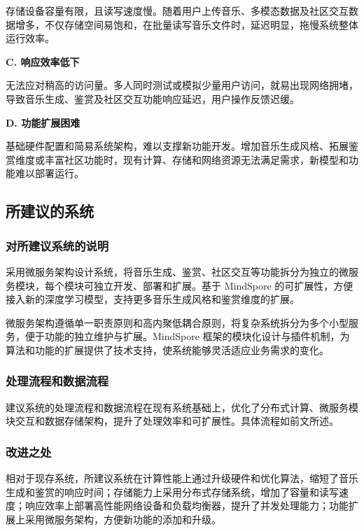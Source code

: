 \documentclass{base}
\numberwithin{figure}{section} %
\begin{document}
存储设备容量有限，且读写速度慢。随着用户上传音乐、多模态数据及社区交互数据增多，不仅存储空间易饱和，在批量读写音乐文件时，延迟明显，拖慢系统整体运行效率。

\textbf{C. 响应效率低下​}

无法应对稍高的访问量。多人同时测试或模拟少量用户访问，就易出现网络拥堵，导致音乐生成、鉴赏及社区交互功能响应延迟，用户操作反馈迟缓。​

\textbf{D. 功能扩展困难​}

基础硬件配置和简易系统架构，难以支撑新功能开发。增加音乐生成风格、拓展鉴赏维度或丰富社区功能时，现有计算、存储和网络资源无法满足需求，新模型和功能难以部署运行。

\subsection{所建议的系统}

\subsubsection{对所建议系统的说明}

采用微服务架构设计系统，将音乐生成、鉴赏、社区交互等功能拆分为独立的微服务模块，每个模块可独立开发、部署和扩展。基于 MindSpore 的可扩展性，方便接入新的深度学习模型，支持更多音乐生成风格和鉴赏维度的扩展。​

微服务架构遵循单一职责原则和高内聚低耦合原则，将复杂系统拆分为多个小型服务，便于功能的独立维护与扩展。MindSpore 框架的模块化设计与插件机制，为算法和功能的扩展提供了技术支持，使系统能够灵活适应业务需求的变化。

\subsubsection{处理流程和数据流程}

建议系统的处理流程和数据流程在现有系统基础上，优化了分布式计算、微服务模块交互和数据存储架构，提升了处理效率和可扩展性。具体流程如前文所述。

\subsubsection{改进之处}

相对于现存系统，所建议系统在计算性能上通过升级硬件和优化算法，缩短了音乐生成和鉴赏的响应时间；存储能力上采用分布式存储系统，增加了容量和读写速度；响应效率上部署高性能网络设备和负载均衡器，提升了并发处理能力；功能扩展上采用微服务架构，方便新功能的添加和升级。
\end{document}
